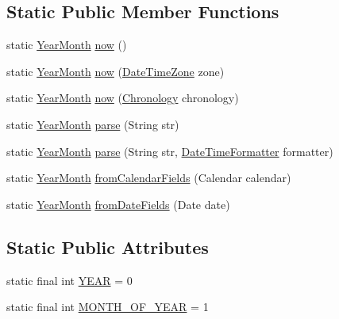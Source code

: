 \subsection*{Static Public Member Functions}
\begin{DoxyCompactItemize}
\item 
static \hyperlink{classorg_1_1joda_1_1time_1_1_year_month}{Year\-Month} \hyperlink{classorg_1_1joda_1_1time_1_1_year_month_ae09558f391a74c96d57e9f638125fd32}{now} ()
\item 
static \hyperlink{classorg_1_1joda_1_1time_1_1_year_month}{Year\-Month} \hyperlink{classorg_1_1joda_1_1time_1_1_year_month_abadb1cd827de9ec97a10af261e55e2a6}{now} (\hyperlink{classorg_1_1joda_1_1time_1_1_date_time_zone}{Date\-Time\-Zone} zone)
\item 
static \hyperlink{classorg_1_1joda_1_1time_1_1_year_month}{Year\-Month} \hyperlink{classorg_1_1joda_1_1time_1_1_year_month_a582a40d6dc0c7c3d86e9ae314b2c51c8}{now} (\hyperlink{classorg_1_1joda_1_1time_1_1_chronology}{Chronology} chronology)
\item 
static \hyperlink{classorg_1_1joda_1_1time_1_1_year_month}{Year\-Month} \hyperlink{classorg_1_1joda_1_1time_1_1_year_month_a1f2e3ead4bb00112046b1cccb38dfe9e}{parse} (String str)
\item 
static \hyperlink{classorg_1_1joda_1_1time_1_1_year_month}{Year\-Month} \hyperlink{classorg_1_1joda_1_1time_1_1_year_month_a0aea4ad79195d8697e10a2035d90c147}{parse} (String str, \hyperlink{classorg_1_1joda_1_1time_1_1format_1_1_date_time_formatter}{Date\-Time\-Formatter} formatter)
\item 
static \hyperlink{classorg_1_1joda_1_1time_1_1_year_month}{Year\-Month} \hyperlink{classorg_1_1joda_1_1time_1_1_year_month_a83851914a0b509cbb873183634670ed2}{from\-Calendar\-Fields} (Calendar calendar)
\item 
static \hyperlink{classorg_1_1joda_1_1time_1_1_year_month}{Year\-Month} \hyperlink{classorg_1_1joda_1_1time_1_1_year_month_a5778aa81a3d1965c66215d82faeaec3c}{from\-Date\-Fields} (Date date)
\end{DoxyCompactItemize}
\subsection*{Static Public Attributes}
\begin{DoxyCompactItemize}
\item 
static final int \hyperlink{classorg_1_1joda_1_1time_1_1_year_month_a2fdfd0632bd8c9bab64382e4c7c71289}{Y\-E\-A\-R} = 0
\item 
static final int \hyperlink{classorg_1_1joda_1_1time_1_1_year_month_a0df50d28e9947cc550e7e2465cc7c9a0}{M\-O\-N\-T\-H\-\_\-\-O\-F\-\_\-\-Y\-E\-A\-R} = 1
\end{DoxyCompactItemize}
